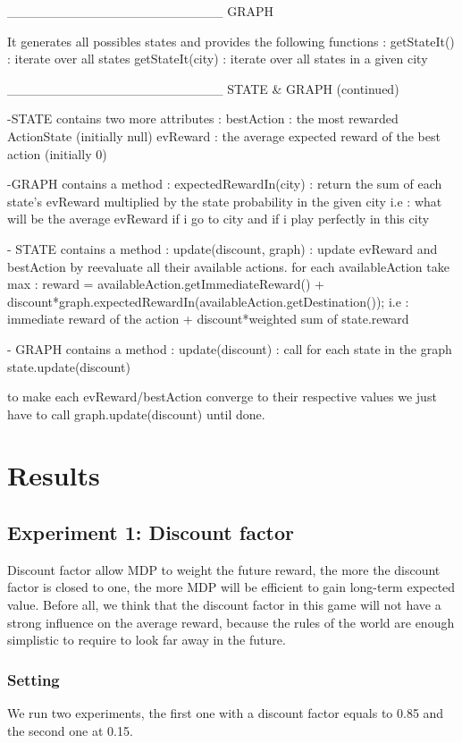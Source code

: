 \documentclass[11pt]{article}
\begin{document}
_______________________ GRAPH

It generates all possibles states and provides the following functions :
getStateIt() : iterate over all states
getStateIt(city) : iterate over all states in a given city


_______________________ STATE & GRAPH (continued)

-STATE contains two more attributes :
bestAction : the most rewarded ActionState (initially null)
evReward : the average expected reward of the best action (initially 0)

-GRAPH contains a method :
expectedRewardIn(city) : return the sum of each state's evReward multiplied by the state probability in the given city
i.e : what will be the average evReward if i go to city and if i play perfectly in this city

- STATE contains a method :
update(discount, graph) : update evReward and bestAction by reevaluate all their available actions.
for each availableAction take max :
reward = availableAction.getImmediateReward() + discount*graph.expectedRewardIn(availableAction.getDestination());
i.e : immediate reward of the action + discount*weighted sum of state.reward

- GRAPH contains a method :
update(discount) : call for each state in the graph state.update(discount)


to make each evReward/bestAction converge to their respective values we just have to call graph.update(discount)
until done.


\section{Results}


\subsection{Experiment 1: Discount factor}
Discount factor allow MDP to weight the future reward, the more the discount factor is closed to one, the more
MDP will be efficient to gain long-term expected value.
Before all, we think that the discount factor in this game will not have a strong influence on the average reward,
because the rules of the world are enough simplistic to require to look far away in the future.

\subsubsection{Setting}
We run two experiments, the first one with a discount factor equals to 0.85 and the second one at 0.15.
\end{document}

